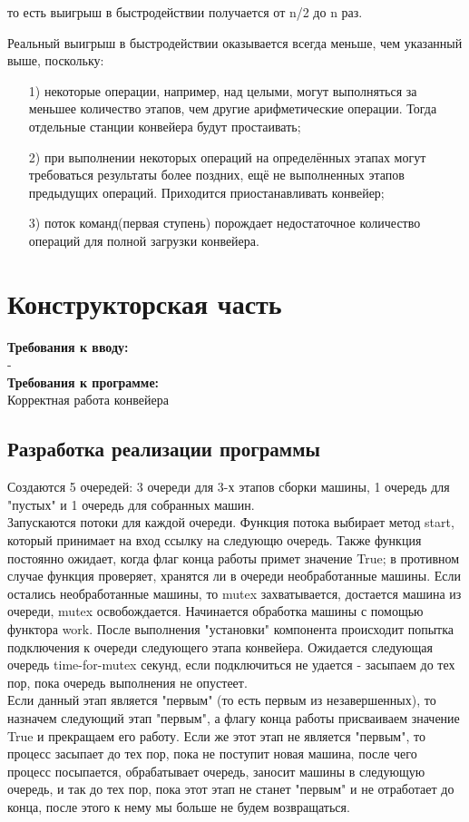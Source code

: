 \documentclass[12pt]{report}
\begin{document}
то есть выигрыш в быстродействии получается от n/2  до n раз.

Реальный выигрыш в быстродействии оказывается всегда меньше, чем указанный выше, поскольку:

\begin{enumerate}
\item[1)] некоторые операции, например, над целыми, могут выполняться за меньшее количество этапов, чем другие арифметические операции. Тогда отдельные станции конвейера будут простаивать;
\item[2)] при выполнении некоторых операций на определённых этапах могут требоваться результаты более поздних, ещё не выполненных этапов предыдущих операций. Приходится приостанавливать конвейер;
\item[3)] поток команд(первая ступень) порождает недостаточное количество операций для полной загрузки конвейера.
\end{enumerate}



\chapter{Конструкторская часть}
\textbf{Требования к вводу:}\\
-\\
\textbf{Требования к программе:}\\
Корректная работа конвейера \\


\section{Разработка реализации программы}


Создаются 5 очередей: 3 очереди для 3-х этапов сборки машины, 1 очередь для "пустых"  и 1 очередь для собранных машин.\\
Запускаются потоки для каждой очереди. Функция потока выбирает метод start, который принимает на вход ссылку на следующю очередь. Также функция постоянно ожидает, когда флаг конца работы примет значение True; в противном случае функция проверяет, хранятся ли в очереди необработанные машины. Если остались необработанные машины, то mutex захватывается, достается машина из очереди, mutex освобождается. Начинается обработка машины с помощью функтора work. После выполнения "установки" компонента происходит попытка подключения к очереди следующего этапа конвейера. Ожидается следующая очередь time-for-mutex секунд, если подключиться не удается - засыпаем до тех пор, пока очередь выполнения не опустеет.\\
Если данный этап является "первым" (то есть первым из незавершенных), то назначем следующий этап "первым", а флагу конца работы присваиваем значение True и прекращаем его работу. Если же этот этап не является "первым", то процесс засыпает до тех пор, пока не поступит новая машина, после чего процесс посыпается, обрабатывает очередь, заносит машины в следующую очередь, и так до тех пор, пока этот этап не станет "первым" и не отработает до конца, после этого к нему мы больше не будем возвращаться.\\
\end{document}

